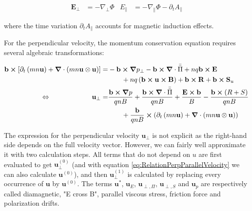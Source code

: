 \begin{align}
	\mathbf{E}_\perp &= -\nabla_\perp \Phi &
	E_\parallel &= -\nabla_\parallel \Phi - \partial_t A_\parallel
\end{align}

where the time variation $\partial_t A_\parallel$ accounts for magnetic induction effects.





For the perpendicular velocity, the momentum conservation equation requires several algebraic transformations:

\begin{align}
	\mathbf{b}\cross\left[\partial_t \left(mn\mathbf{u}\right) + \grad\cdot\left(mn\mathbf{u}\otimes\mathbf{u}\right)\right] =& -\mathbf{b}\cross\grad p_\perp - \mathbf{b}\cross\grad\cdot\bar{\bar{\Pi}} + nq\mathbf{b}\cross\mathbf{E} \nonumber\\ & \qquad + nq\left(\mathbf{b}\cross\mathbf{u}\cross\mathbf{B}\right) + \mathbf{b}\cross\mathbf{R} + \mathbf{b}\cross\mathbf{S}_u \nonumber \\
	\Leftrightarrow\qquad \qquad \qquad
	\mathbf{u}_\perp =& \frac{\mathbf{b}\cross\grad p}{qnB} + \frac{\mathbf{b}\cross\grad\cdot\bar{\bar{\Pi}}}{qnB} +  \frac{\mathbf{E}\cross\mathbf{b}}{B} - \frac{\mathbf{b}\cross\left(R+S\right)}{qnB} \nonumber\\ & \qquad + \frac{\mathbf{b}}{qnB} \cross \left(\partial_t \left(mn\mathbf{u}\right) + \grad\cdot\left(mn\mathbf{u}\otimes\mathbf{u}\right)\right)
\end{align}

The expression for the perpendicular velocity $\mathbf{u}_\perp$ is not explicit as the right-hand side depends on the full velocity vector. However, we can fairly well approximate it with two calculation steps. All terms that do not depend on $u$ are first evaluated to get $\mathbf{u}_\perp^{(0)}$ (and with equation \ref{eq:RelationPerpParallelVelocity} we can also calculate $\mathbf{u}^{(0)}$), and then $\mathbf{u}_\perp^{(1)}$ is calculated by replacing every occurrence of $\mathbf{u}$ by $\mathbf{u}^{(0)}$. The terms $\mathbf{u}^*$, $\mathbf{u}_E$, $\mathbf{u}_{\perp,\Pi}$, $\mathbf{u}_{\perp,S}$ and $\mathbf{u}_{p}$ are respectively called diamagnetic, "E cross B", parallel viscous stress, friction force and polarization drifts.

